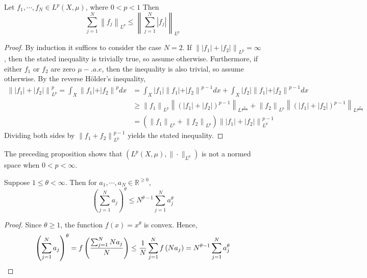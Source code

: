 \begin{proposition}
    Let $f_{1}, \cdots, f_{N} \in L^{p}(X, \mu)$, where $0<p<1$ Then
    \[
        \sum_{j=1}^{N}\left\|f_{j}\right\|_{L^{p}} \leq\left\|\sum_{j=1}^{N}\left|f_{j}\right|\right\|_{L^{p}}
    \]
\end{proposition}
\begin{proof}
    By induction it suffices to consider the case $N=2 .$ If $\left\|\left|f_{1}\right|+\left|f_{2}\right|\right\|_{L^{p}}=\infty$, then the stated inequality is trivially true, so assume otherwise. Furthermore, if either $f_{1}$ or $f_{2}$ are zero $\mu-. a . e$, then the inequality is also trivial, so assume otherwise. By the reverse Hölder's inequality,
    \[
        \begin{aligned}
        \left\|\left|f_{1}\right|+\left|f_{2}\right|\right\|_{L^{p}}^{p}=\int_{X}\left\|f_{1}|+| f_{2}\right\|^{p} d x &=\int_{X}\left|f_{1}\right|\left\|f_{1}|+| f_{2}\right\|^{p-1} d x+\int_{X}\left|f_{2}\right|\left\|f_{1}|+| f_{2}\right\|^{p-1} d x \\
        & \geq\left\|f_{1}\right\|_{L^{p}}\left\|\left(\left|f_{1}\right|+\left|f_{2}\right|\right)^{p-1}\right\|_{L^{\frac{p}{p-1}}}+\left\|f_{2}\right\|_{L^{p}}\left\|\left(\left|f_{1}\right|+\left|f_{2}\right|\right)^{p-1}\right\|_{L^{\frac{p}{p-1}}} \\
        &=\left(\left\|f_{1}\right\|_{L^{p}}+\left\|f_{2}\right\|_{L^{p}}\right)\left\|\left|f_{1}\right|+\left|f_{2}\right|\right\|_{L^{p}}^{p-1}
        \end{aligned}
    \]
    Dividing both sides by $\left\|f_{1}+f_{2}\right\|_{L^{p}}^{p-1}$ yields the stated inequality. 
\end{proof}
The preceding proposition shows that $\left(L^{p}(X, \mu),\|\cdot\|_{L^{p}}\right)$ is not a normed space when $0<p<\infty$.

\begin{lemma}
    Suppose $1 \leq \theta<\infty$. Then for $a_{1}, \cdots, a_{N} \in \mathbb{R}^{\geq 0}$,
    \[
        \left(\sum_{j=1}^{N} a_{j}\right)^{\theta} \leq N^{\theta-1} \sum_{j=1}^{N} a_{j}^{\theta}
    \]
\end{lemma}
\begin{proof}
    Since $\theta \geq 1$, the function $f(x)=x^{\theta}$ is convex. Hence,
    \[
        \left(\sum_{j=1}^{N} a_{j}\right)^{\theta}=f\left(\frac{\sum_{j=1}^{N} N a_{j}}{N}\right) \leq \frac{1}{N} \sum_{j=1}^{N} f\left(N a_{j}\right)=N^{\theta-1} \sum_{j=1}^{N} a_{j}^{\theta} \qedhere
    \]
\end{proof}

